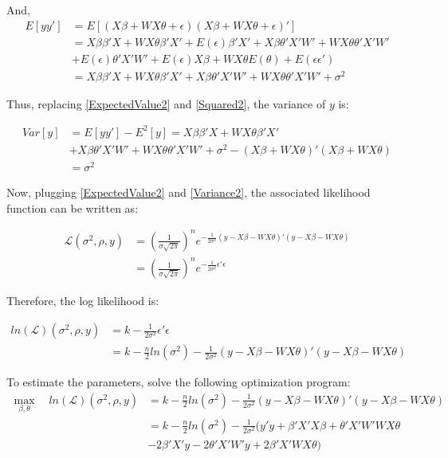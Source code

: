 \documentclass[12pt]{article}
\begin{document}
\begin{enumerate}
\begin{enumerate}
\begin{enumerate}
      And, 
      \begin{align}
          E[yy'] &= E[(X\beta + WX\theta +\epsilon) (X\beta + WX\theta +\epsilon)'] \nonumber\\
          &= X\beta \beta' X + WX \theta \beta' X' + E(\epsilon) \beta' X' + X \beta \theta' X' W' + W X \theta \theta' X' W' \nonumber \\ 
          &+ E(\epsilon) \theta' X' W' + E(\epsilon) X \beta + WX\theta E(\theta) + E(\epsilon \epsilon')\nonumber \\
          &= X\beta \beta' X + WX \theta \beta' X' +  X \beta \theta' X' W' + W X \theta \theta' X' W' + \sigma^2 \label{Squared2}
      \end{align}
      
      Thus, replacing \eqref{ExpectedValue2} and \eqref{Squared2}, the variance of $y$ is:
      
      \begin{align}
          Var[y] &= E[yy'] - E^2[y] = X\beta \beta' X + WX \theta \beta' X' \nonumber\\
          &+  X \beta \theta' X' W' + W X \theta \theta' X' W' + \sigma^2 - (X\beta + WX\theta)' (X\beta + WX\theta) \nonumber \\
          &= \sigma^2 \label{Variance2}
      \end{align}

     Now, plugging \eqref{ExpectedValue2} and \eqref{Variance2}, the associated likelihood function can be written as: 
     
     \begin{align*}
     \mathcal{L} (\sigma^2, \rho, y) &= \left( \frac{1}{\sigma \sqrt{2 \pi}}\right)^n  e^{-\frac{1}{2\sigma^2} (y- X\beta - W X \theta)' (y- X\beta - W X \theta)} \\
     &= \left( \frac{1}{\sigma \sqrt{2 \pi}}\right)^n  e^{-\frac{1}{2\sigma^2} \epsilon' \epsilon}
     \end{align*}
     
     Therefore, the log likelihood is:
      
      \begin{align*}
     ln(\mathcal{L}) (\sigma^2, \rho, y) &= k - \frac{1}{2 \sigma^2} \epsilon' \epsilon\\
     &= k -\frac{n}{2} ln(\sigma^2) - \frac{1}{2 \sigma^2} (y- X\beta - W X \theta)' (y- X\beta - W X \theta)
     \end{align*}
     
     To estimate the parameters, solve the following optimization program:
      \begin{align}
          \max_{\beta, \theta} \quad ln(\mathcal{L}) (\sigma^2, \rho, y) &= k -\frac{n}{2} ln(\sigma^2) - \frac{1}{2 \sigma^2} (y- X\beta - W X \theta)' (y- X\beta - W X \theta) \label{OptMV}\\
          &= k -\frac{n}{2} ln(\sigma^2) - \frac{1}{2 \sigma^2} (y'y + \beta' X' X \beta + \theta' X' W' W X \theta \nonumber\\
          &- 2 \beta' X' y - 2 \theta' X' W' y + 2 \beta' X' W X \theta ) \nonumber
      \end{align}
     

\end{enumerate}
\end{enumerate}
\end{enumerate}
\end{document}
